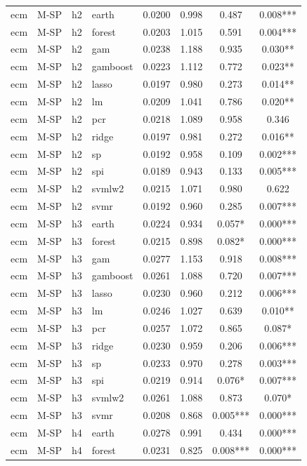 \begin{ThreePartTable}
\begin{longtable}[t]{llclcccc}
\addlinespace
ecm & M-SP & h2 & earth & 0.0200 & 0.998 & 0.487 & 0.008***\\
ecm & M-SP & h2 & forest & 0.0203 & 1.015 & 0.591 & 0.004***\\
ecm & M-SP & h2 & gam & 0.0238 & 1.188 & 0.935 & 0.030**\\
ecm & M-SP & h2 & gamboost & 0.0223 & 1.112 & 0.772 & 0.023**\\
ecm & M-SP & h2 & lasso & 0.0197 & 0.980 & 0.273 & 0.014**\\
ecm & M-SP & h2 & lm & 0.0209 & 1.041 & 0.786 & 0.020**\\
ecm & M-SP & h2 & pcr & 0.0218 & 1.089 & 0.958 & 0.346\\
ecm & M-SP & h2 & ridge & 0.0197 & 0.981 & 0.272 & 0.016**\\
ecm & M-SP & h2 & sp & 0.0192 & 0.958 & 0.109 & 0.002***\\
ecm & M-SP & h2 & spi & 0.0189 & 0.943 & 0.133 & 0.005***\\
ecm & M-SP & h2 & svmlw2 & 0.0215 & 1.071 & 0.980 & 0.622\\
ecm & M-SP & h2 & svmr & 0.0192 & 0.960 & 0.285 & 0.007***\\
\addlinespace
ecm & M-SP & h3 & earth & 0.0224 & 0.934 & 0.057* & 0.000***\\
ecm & M-SP & h3 & forest & 0.0215 & 0.898 & 0.082* & 0.000***\\
ecm & M-SP & h3 & gam & 0.0277 & 1.153 & 0.918 & 0.008***\\
ecm & M-SP & h3 & gamboost & 0.0261 & 1.088 & 0.720 & 0.007***\\
ecm & M-SP & h3 & lasso & 0.0230 & 0.960 & 0.212 & 0.006***\\
ecm & M-SP & h3 & lm & 0.0246 & 1.027 & 0.639 & 0.010**\\
ecm & M-SP & h3 & pcr & 0.0257 & 1.072 & 0.865 & 0.087*\\
ecm & M-SP & h3 & ridge & 0.0230 & 0.959 & 0.206 & 0.006***\\
ecm & M-SP & h3 & sp & 0.0233 & 0.970 & 0.278 & 0.003***\\
ecm & M-SP & h3 & spi & 0.0219 & 0.914 & 0.076* & 0.007***\\
ecm & M-SP & h3 & svmlw2 & 0.0261 & 1.088 & 0.873 & 0.070*\\
ecm & M-SP & h3 & svmr & 0.0208 & 0.868 & 0.005*** & 0.000***\\
\addlinespace
ecm & M-SP & h4 & earth & 0.0278 & 0.991 & 0.434 & 0.000***\\
ecm & M-SP & h4 & forest & 0.0231 & 0.825 & 0.008*** & 0.000***\\

\end{longtable}
\end{ThreePartTable}
